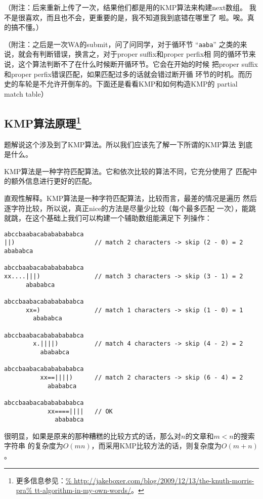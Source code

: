 （附注：后来重新上传了一次，结果他们都是用的KMP算法来构建next数组。
我不是很喜欢，而且也不会，更重要的是，我不知道我到底错在哪里了
啦。唉。真的搞不懂。）

（附注：之后是一次WA的submit，问了问同学，对于循环节 “\verb|aaba|”
之类的来说，就会有判断错误，换言之，对于proper suffix和proper perfix相
同的循环节来说，这个算法判断不了在什么时候断开循环节。它会在开始的时候
把proper suffix和proper perfix错误匹配，如果匹配过多的话就会错过断开循
环节的时机。而历史的车轮是不允许开倒车的。下面还是看看KMP和如何构造KMP的
partial match table）

\subsection[KMP算法原理]{KMP算法原理\footnote{更多信息参见：\url{%
http://jakeboxer.com/blog/2009/12/13/the-knuth-morris-pra%
tt-algorithm-in-my-own-words/}。}}

题解说这个涉及到了KMP算法。所以我们应该先了解一下所谓的KMP算法
到底是什么。

KMP算法是一种字符匹配算法。它和依次比较的算法不同，它充分使用了
匹配中的额外信息进行更好的匹配。

直观性解释。KMP算法是一种字符匹配算法，比较而言，最差的情况是遍历
然后逐字符比较，所以说，真正nice的方法是尽量少比较（每个最多匹配
一次），能跳就跳，在这个基础上我们可以构建一个辅助数组能满足下
列操作：
\begin{lstlisting}
abccbaabacabababababca
||)                      // match 2 characters -> skip (2 - 0) = 2
abababca

abccbaabacabababababca
xx....|||)               // match 3 characters -> skip (3 - 1) = 2
      abababca

abccbaabacabababababca
      xx=)               // match 1 characters -> skip (1 - 0) = 1
        abababca

abccbaabacabababababca
        x.||||)          // match 4 characters -> skip (4 - 2) = 2
          abababca

abccbaabacabababababca
          xx==||||)      // match 2 characters -> skip (6 - 4) = 2
            abababca

abccbaabacabababababca
            xx====||||   // OK
              abababca
\end{lstlisting}

很明显，如果是原来的那种糟糕的比较方式的话，那么对$n$的文章和$m<n$的搜索字符串
的复杂度为$O(mn)$，而采用KMP比较方法的话，则复杂度为$O(m+n)$。

\def\ttstr{\text{\verb|string|}}

